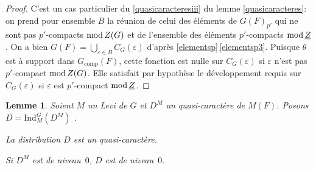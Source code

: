\documentclass[JEP,XML,SOM,Unicode,francais]{cedram}
\let\oldenumerate\enumerate
\renewcommand{\enumerate}{\oldenumerate\itemindent0pt}
\newenvironment{enumeratei}
{\bgroup\def\theenumi{\roman{enumi}}\def\theenumii{\arabic{enumii}}\oldenumerate}
{\endenumerate\egroup}
\let\epsilon\varepsilon
\newcommand{\rmod}{\textup{mod}\,}
\newcommand{\comp}{\mathrm{comp}}
\newcommand{\Ind}{\mathrm{Ind}}
\theoremstyle{plain}
\newtheorem*{lem*}{Lemme}
\theoremstyle{definition}
\begin{document}
\begin{proof}
C'est un cas particulier du \eqref{quasicaracteresiii} du lemme \ref{quasicaracteres}: on prend pour ensemble $B$ la réunion de celui des éléments de $G(F)_{p'}$ qui ne sont pas $p'$-compacts $\rmod Z(G)$ et de l'ensemble des éléments $p'$-compacts $\rmod \underline{Z}$. On a bien $G(F)=\bigcup_{\epsilon\in B}C_{G}(\epsilon)$ d'après \ref{elementsp}\,\eqref{elementsp3}. Puisque $\theta$ est à support dans $G_{\comp}(F)$, cette fonction est nulle sur $C_{G}(\epsilon)$ si $\epsilon$ n'est pas $p'$-compact $\rmod Z(G)$. Elle satisfait par hypothèse le développement requis sur $C_{G}(\epsilon)$ si $\epsilon$ est $p'$-compact $\rmod \underline{Z}$.
\end{proof}

\label{induction}

\begin{lem*}
Soient $M$ un Levi de $G$ et $D^M$ un quasi-caractère de $M(F)$. Posons $D= \Ind_{M}^G(D^M)$ .
\begin{enumeratei}
\item\label{inductioni}
La distribution $D$ est un quasi-caractère.

\item\label{inductionii}
Si $D^M$ est de niveau~$0$, $D$ est de niveau~$0$.
\end{enumeratei}
\end{lem*}
\end{document}
